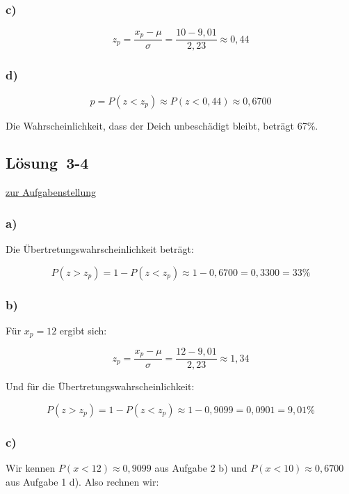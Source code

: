 \documentclass[
  11pt,
  ngerman,
  a4paper,
]{report}
\begin{document}
\hypertarget{c-8}{%
\subsubsection{c)}\label{c-8}}

\[z_p=\frac{x_p- \mu}{\sigma} = \frac{10-9,01}{2,23}\approx0,44\]

\hypertarget{d-3}{%
\subsubsection{d)}\label{d-3}}

\[p=P(z<z_p)\approx P(z<0,44)\approx0,6700\]

Die Wahrscheinlichkeit, dass der Deich unbeschädigt bleibt, beträgt 67\%.

\hypertarget{loesung-3-4}{%
\subsection{Lösung~3-4}\label{loesung-3-4}}

\protect\hyperlink{aufgabe-3-4}{zur Aufgabenstellung}

\hypertarget{a-11}{%
\subsubsection{a)}\label{a-11}}

Die Übertretungswahrscheinlichkeit beträgt:

\[P(z>z_p) = 1- P(z<z_p) \approx 1-0,6700 = 0,3300 = 33\% \]

\hypertarget{b-11}{%
\subsubsection{b)}\label{b-11}}

Für \(x_p=12\) ergibt sich:

\[ z_p=\frac{x_p- \mu}{\sigma} = \frac{12-9,01}{2,23}\approx1,34 \]

Und für die Übertretungswahrscheinlichkeit:

\[P(z>z_p) = 1- P(z<z_p) \approx 1-0,9099 = 0,0901= 9,01\% \]

\hypertarget{c-9}{%
\subsubsection{c)}\label{c-9}}

Wir kennen \(P(x < 12)\approx0,9099\) aus Aufgabe 2 b) und \(P(x<10)\approx0,6700\) aus Aufgabe 1 d). Also rechnen wir:
\end{document}

